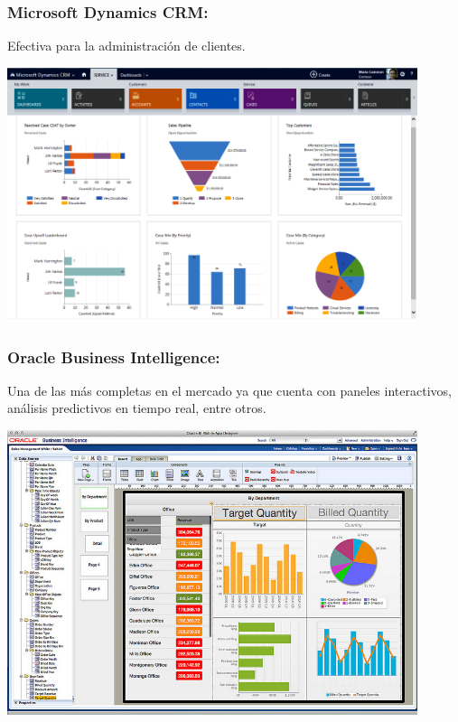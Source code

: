 \subsubsection{Microsoft Dynamics CRM: }\label{sec:nada2}  
Efectiva para la administración de clientes.
	\begin{center}
	\includegraphics[width=12cm]{./Imagenes/BIimagen2}
	\end{center}
	
\subsubsection{Oracle Business Intelligence: }\label{sec:nada2} 
Una de las más completas en el mercado ya que cuenta con paneles interactivos, análisis predictivos en tiempo real, entre otros.
	\begin{center}
	\includegraphics[width=12cm]{./Imagenes/BIimagen3}
	\end{center}
	
\newpage
